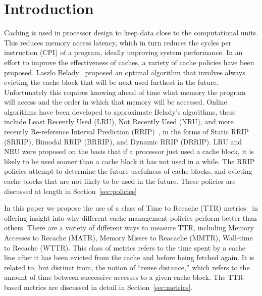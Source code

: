 \section{Introduction}
Caching is used in processor design to keep data close to the computational units.
This reduces memory access latency, which in turn reduces the cycles per instruction (CPI) of a program, ideally improving system performance.
In an effort to improve the effectiveness of caches, a variety of cache policies have been proposed.
Laszlo Belady~\cite{belady66} proposed an optimal algorithm that involves always evicting the cache block that will be next used furthest in the future.
Unfortunately this requires knowing ahead of time what memory the program will access and the order in which that memory will be accessed.
Online algorithms have been developed to approximate Belady's algorithms,
	these include Least Recently Used (LRU), Not Recently Used (NRU),
	and more recently Re-reference Interval Prediction (RRIP)~\cite{jaleeltheobald10},
	in the forms of Static RRIP (SRRIP), Bimodal RRIP (BRRIP), and Dynamic RRIP (DRRIP).
LRU and NRU were proposed on the basis that if a processor just used a cache block,
	it is likely to be used sooner than a cache block it has not used in a while.
The RRIP policies attempt to determine the future usefulness of cache blocks,
	and evicting cache blocks that are not likely to be used in the future.
These policies are discussed at length in Section~\ref{sec:policies}

In this paper we propose the use of a class of Time to Recache (TTR) metrics~\cite{spjutpugsley17} in offering insight into why different cache management policies perform better than others.  
There are a variety of different ways to measure TTR, including Memory Accesses to Recache (MATR), Memory Misses to Reacache (MMTR), Wall-time to Recache (WTTR). 
This class of metrics refers to the time spent by a cache line after it has been evicted from the cache and before being fetched again.  
It is related to, but distinct from, the notion of ``reuse distance,'' which refers to the amount of time between successive accesses to a given cache block.
The TTR-based metrics are discussed in detail in Section~\ref{sec:metrics}.


